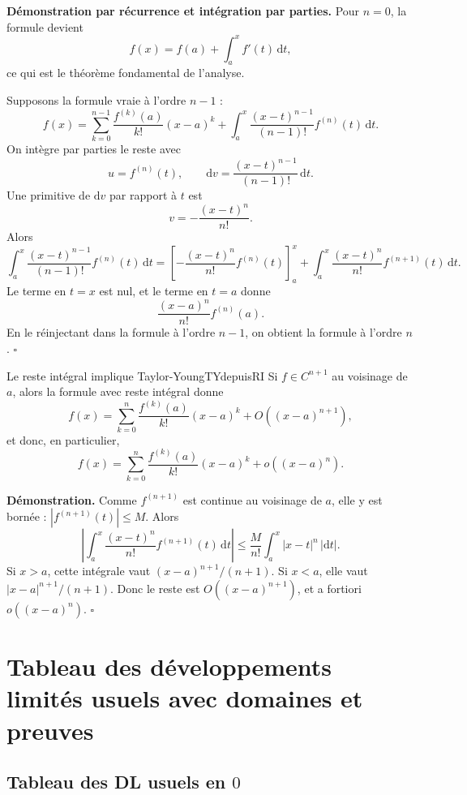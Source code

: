 \documentclass[11pt,a4paper]{article}
\newcommand{\dd}{\mathrm{d}}
\begin{document}
\textbf{Démonstration par récurrence et intégration par parties.} Pour $n=0$, la formule devient
\[
  f(x)=f(a)+\int_a^x f'(t)\,\dd t,
\]
ce qui est le théorème fondamental de l'analyse.

Supposons la formule vraie à l'ordre $n-1$ :
\[
  f(x)=\sum_{k=0}^{n-1}\frac{f^{(k)}(a)}{k!}(x-a)^k
  +\int_a^x \frac{(x-t)^{n-1}}{(n-1)!}f^{(n)}(t)\,\dd t.
\]
On intègre par parties le reste avec
\[
  u=f^{(n)}(t),\qquad \dd v=\frac{(x-t)^{n-1}}{(n-1)!}\,\dd t.
\]
Une primitive de $\dd v$ par rapport à $t$ est
\[
  v=-\frac{(x-t)^n}{n!}.
\]
Alors
\[
\int_a^x \frac{(x-t)^{n-1}}{(n-1)!}f^{(n)}(t)\,\dd t
=
\left[-\frac{(x-t)^n}{n!}f^{(n)}(t)\right]_a^x
+\int_a^x \frac{(x-t)^n}{n!}f^{(n+1)}(t)\,\dd t.
\]
Le terme en $t=x$ est nul, et le terme en $t=a$ donne
\[
  \frac{(x-a)^n}{n!}f^{(n)}(a).
\]
En le réinjectant dans la formule à l'ordre $n-1$, on obtient la formule à l'ordre $n$.
\hfill $\square$

\begin{propositionbox}{Le reste intégral implique Taylor-Young}{TYdepuisRI}
Si $f\in C^{n+1}$ au voisinage de $a$, alors la formule avec reste intégral donne
\[
  f(x)=\sum_{k=0}^{n}\frac{f^{(k)}(a)}{k!}(x-a)^k+O((x-a)^{n+1}),
\]
et donc, en particulier,
\[
  f(x)=\sum_{k=0}^{n}\frac{f^{(k)}(a)}{k!}(x-a)^k+o((x-a)^n).
\]
\end{propositionbox}

\textbf{Démonstration.} Comme $f^{(n+1)}$ est continue au voisinage de $a$, elle y est bornée : $|f^{(n+1)}(t)|\le M$. Alors
\[
\left|\int_a^x \frac{(x-t)^n}{n!}f^{(n+1)}(t)\,\dd t\right|
\le \frac{M}{n!}\int_a^x |x-t|^n\,|\dd t|.
\]
Si $x>a$, cette intégrale vaut $(x-a)^{n+1}/(n+1)$. Si $x<a$, elle vaut $|x-a|^{n+1}/(n+1)$. Donc le reste est $O((x-a)^{n+1})$, et a fortiori $o((x-a)^n)$.
\hfill $\square$

\section{Tableau des développements limités usuels avec domaines et preuves}

\subsection{Tableau des DL usuels en $0$}
\end{document}
